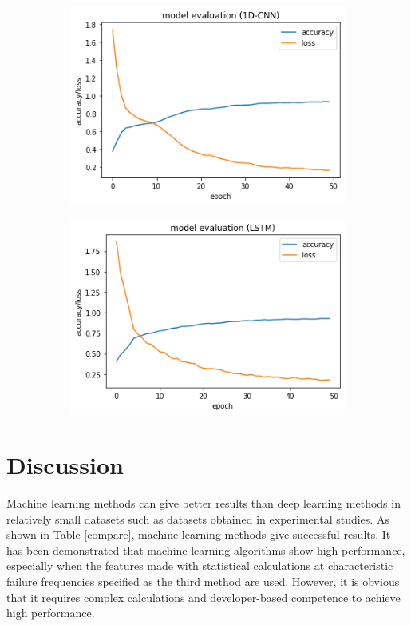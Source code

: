 \begin{figure}[h]
	\begin{subfigure}[b]{.5\linewidth}
		\centering
		\includegraphics[scale=.5]{./fig/cnn_accloss.png}
		\label{tracnn}
	\end{subfigure}
	\begin{subfigure}[b]{.5\linewidth}
		\centering
		\includegraphics[scale=.5]{./fig/lstmaccloss.png}
		\label{tralstm}
	\end{subfigure}
\end{figure}

\section{Discussion}

Machine learning methods can give better results than deep learning methods in relatively small datasets such as datasets obtained in experimental studies. As shown in Table \ref{compare}, machine learning methods give successful results. It has been demonstrated that machine learning algorithms show high performance, especially when the features made with statistical calculations at characteristic failure frequencies specified as the third method are used. However, it is obvious that it requires complex calculations and developer-based competence to achieve high performance.


